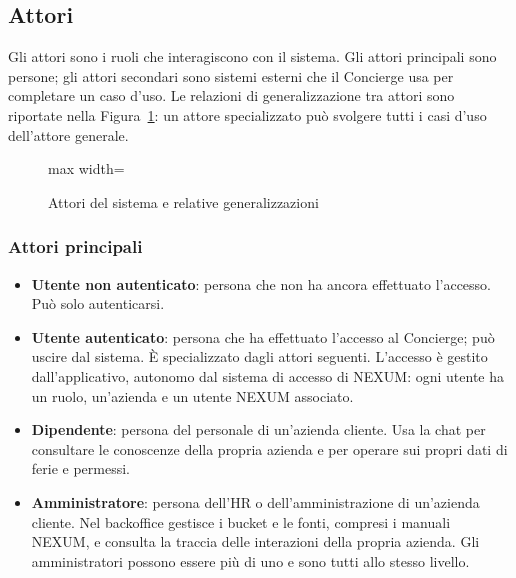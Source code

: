 \documentclass[documento]{gpt}
\newcommand{\attore}[3]{%
  \node[attorebox] (#1) at #2 {};
  \begin{scope}[shift={(#1.center)}, line width=0.7pt, draw=gptinchiostro]
    \draw[fill=white] (0,0.55) circle (0.22);
    \draw (0,0.33) -- (0,-0.35);
    \draw (-0.38,0.12) -- (0.38,0.12);
    \draw (0,-0.35) -- (-0.3,-0.85) (0,-0.35) -- (0.3,-0.85);
  \end{scope}
  \node[font=\sffamily\footnotesize, align=center, anchor=north, inner sep=2pt]
    (#1-l) at (#1.south) {#3};}
\begin{document}
\subsection{Attori}\label{sec:attori}
Gli attori sono i ruoli che interagiscono con il sistema. Gli attori principali
sono persone; gli attori secondari sono sistemi esterni che il Concierge usa
per completare un caso d'uso. Le relazioni di generalizzazione tra attori sono
riportate nella Figura~\ref{fig:attori}: un attore specializzato può svolgere
tutti i casi d'uso dell'attore generale.

\begin{figure}[H]
  \centering
  \begin{adjustbox}{max width=\linewidth}
  \end{adjustbox}
  \caption{Attori del sistema e relative generalizzazioni}\label{fig:attori}
\end{figure}

\subsubsection{Attori principali}
\begin{itemize}
  \item \textbf{Utente non autenticato}: persona che non ha ancora effettuato
        l'accesso. Può solo autenticarsi.
  \item \textbf{Utente autenticato}: persona che ha effettuato l'accesso al
        Concierge; può uscire dal sistema. È specializzato dagli attori seguenti.
        L'accesso è gestito dall'applicativo, autonomo dal sistema di accesso di
        NEXUM: ogni utente ha un ruolo, un'azienda e un utente NEXUM associato.
  \item \textbf{Dipendente}: persona del personale di un'azienda cliente. Usa la
        chat per consultare le conoscenze della propria azienda e per operare
        sui propri dati di ferie e permessi.
  \item \textbf{Amministratore}: persona dell'HR o dell'amministrazione di
        un'azienda cliente. Nel backoffice gestisce i bucket e le fonti, compresi
        i manuali NEXUM, e consulta la traccia delle interazioni della propria
        azienda. Gli amministratori possono essere più di uno e sono tutti allo
        stesso livello.
\end{itemize}
\end{document}
